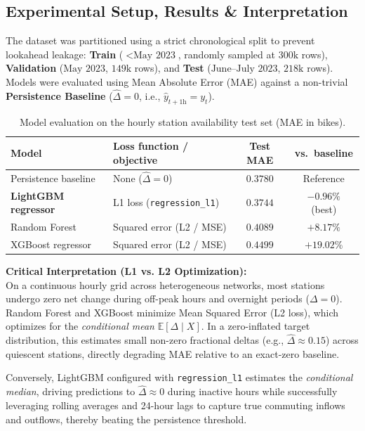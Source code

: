 \documentclass[11pt,a4paper,english]{article}
\begin{document}
\subsection{Experimental Setup, Results \& Interpretation}

The dataset was partitioned using a strict chronological split to prevent lookahead leakage: \textbf{Train} ($< \text{May 2023}$, randomly sampled at $300\text{k}$ rows), \textbf{Validation} ($\text{May 2023}$, $149\text{k}$ rows), and \textbf{Test} ($\text{June--July 2023}$, $218\text{k}$ rows). Models were evaluated using Mean Absolute Error (MAE) against a non-trivial \textbf{Persistence Baseline} ($\hat{\Delta} = 0$, i.e., $\hat{y}_{t+1\text{h}} = y_t$).

\begin{table}[htbp]
    \centering
    \small
    \caption{Model evaluation on the hourly station availability test set (MAE in bikes).}
    \label{tab:supervised_results}
    \begin{tabularx}{\textwidth}{l Y c c}
        \toprule
        \textbf{Model} & \textbf{Loss function / objective} & \textbf{Test MAE} & \textbf{vs.\ baseline} \\
        \midrule
        Persistence baseline & None ($\hat{\Delta} = 0$) & $0.3780$ & Reference \\
        \textbf{LightGBM regressor} & L1 loss (\texttt{regression\_\allowbreak l1}) & $\mathbf{0.3744}$ & $\mathbf{-0.96\%}$ (best) \\
        Random Forest & Squared error (L2 / MSE) & $0.4089$ & $+8.17\%$ \\
        XGBoost regressor & Squared error (L2 / MSE) & $0.4499$ & $+19.02\%$ \\
        \bottomrule
    \end{tabularx}
\end{table}

\noindent\textbf{Critical Interpretation (L1 vs. L2 Optimization):} \\
On a continuous hourly grid across heterogeneous networks, most stations undergo zero net change during off-peak hours and overnight periods ($\Delta = 0$). Random Forest and XGBoost minimize Mean Squared Error (L2 loss), which optimizes for the \textit{conditional mean} $\mathbb{E}[\Delta \mid X]$. In a zero-inflated target distribution, this estimates small non-zero fractional deltas (e.g., $\hat{\Delta} \approx 0.15$) across quiescent stations, directly degrading MAE relative to an exact-zero baseline.

Conversely, LightGBM configured with \texttt{regression\_l1} estimates the \textit{conditional median}, driving predictions to $\hat{\Delta} \approx 0$ during inactive hours while successfully leveraging rolling averages and 24-hour lags to capture true commuting inflows and outflows, thereby beating the persistence threshold.
\end{document}
